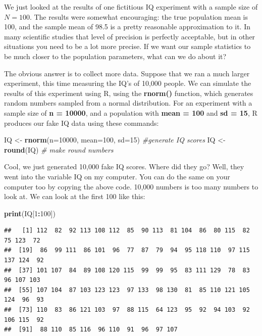 \documentclass[
]{book}
\newenvironment{Shaded}{\begin{snugshade}}{\end{snugshade}}
\newcommand{\AttributeTok}[1]{\textcolor[rgb]{0.13,0.29,0.53}{#1}}
\newcommand{\CommentTok}[1]{\textcolor[rgb]{0.56,0.35,0.01}{\textit{#1}}}
\newcommand{\DecValTok}[1]{\textcolor[rgb]{0.00,0.00,0.81}{#1}}
\newcommand{\FunctionTok}[1]{\textcolor[rgb]{0.13,0.29,0.53}{\textbf{#1}}}
\newcommand{\NormalTok}[1]{#1}
\newcommand{\OtherTok}[1]{\textcolor[rgb]{0.56,0.35,0.01}{#1}}
\newcommand{\SpecialCharTok}[1]{\textcolor[rgb]{0.81,0.36,0.00}{\textbf{#1}}}
\begin{document}
We just looked at the results of one fictitious IQ experiment with a sample size of \(N=100\). The results were somewhat encouraging: the true population mean is 100, and the sample mean of 98.5 is a pretty reasonable approximation to it. In many scientific studies that level of precision is perfectly acceptable, but in other situations you need to be a lot more precise. If we want our sample statistics to be much closer to the population parameters, what can we do about it?

The obvious answer is to collect more data. Suppose that we ran a much larger experiment, this time measuring the IQ's of 10,000 people. We can simulate the results of this experiment using R, using the \textbf{rnorm()} function, which generates random numbers sampled from a normal distribution. For an experiment with a sample size of \textbf{n = 10000}, and a population with \textbf{mean = 100} and \textbf{sd = 15}, R produces our fake IQ data using these commands:

\begin{Shaded}
\begin{Highlighting}[]
\NormalTok{IQ }\OtherTok{\textless{}{-}} \FunctionTok{rnorm}\NormalTok{(}\AttributeTok{n=}\DecValTok{10000}\NormalTok{, }\AttributeTok{mean=}\DecValTok{100}\NormalTok{, }\AttributeTok{sd=}\DecValTok{15}\NormalTok{) }\CommentTok{\#generate IQ scores}
\NormalTok{IQ }\OtherTok{\textless{}{-}} \FunctionTok{round}\NormalTok{(IQ) }\CommentTok{\# make round numbers}
\end{Highlighting}
\end{Shaded}

Cool, we just generated 10,000 fake IQ scores. Where did they go? Well, they went into the variable IQ on my computer. You can do the same on your computer too by copying the above code. 10,000 numbers is too many numbers to look at. We can look at the first 100 like this:

\begin{Shaded}
\begin{Highlighting}[]
\FunctionTok{print}\NormalTok{(IQ[}\DecValTok{1}\SpecialCharTok{:}\DecValTok{100}\NormalTok{])}
\end{Highlighting}
\end{Shaded}

\begin{verbatim}
##   [1] 112  82  92 113 108 112  85  90 113  81 104  86  80 115  82  75 123  72
##  [19]  86  99 111  86 101  96  77  87  79  94  95 118 110  97 115 137 124  92
##  [37] 101 107  84  89 108 120 115  99  99  95  83 111 129  78  83  96 107 103
##  [55] 107 104  87 103 123 123  97 133  98 130  81  85 110 121 105 124  96  93
##  [73] 110  83  86 121 103  97  88 115  64 123  95  92  94 103  92 106 115  92
##  [91]  88 110  85 116  96 110  91  96  97 107
\end{verbatim}
\end{document}
